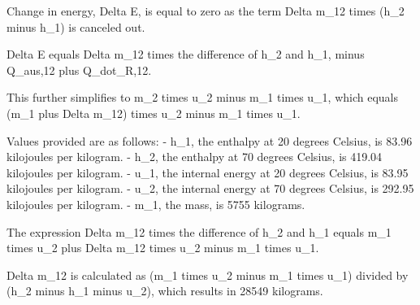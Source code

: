 Change in energy, Delta E, is equal to zero as the term Delta m_12 times (h_2 minus h_1) is canceled out.

Delta E equals Delta m_12 times the difference of h_2 and h_1, minus Q_aus,12 plus Q_dot_R,12.

This further simplifies to m_2 times u_2 minus m_1 times u_1, which equals (m_1 plus Delta m_12) times u_2 minus m_1 times u_1.

Values provided are as follows:
- h_1, the enthalpy at 20 degrees Celsius, is 83.96 kilojoules per kilogram.
- h_2, the enthalpy at 70 degrees Celsius, is 419.04 kilojoules per kilogram.
- u_1, the internal energy at 20 degrees Celsius, is 83.95 kilojoules per kilogram.
- u_2, the internal energy at 70 degrees Celsius, is 292.95 kilojoules per kilogram.
- m_1, the mass, is 5755 kilograms.

The expression Delta m_12 times the difference of h_2 and h_1 equals m_1 times u_2 plus Delta m_12 times u_2 minus m_1 times u_1.

Delta m_12 is calculated as (m_1 times u_2 minus m_1 times u_1) divided by (h_2 minus h_1 minus u_2), which results in 28549 kilograms.